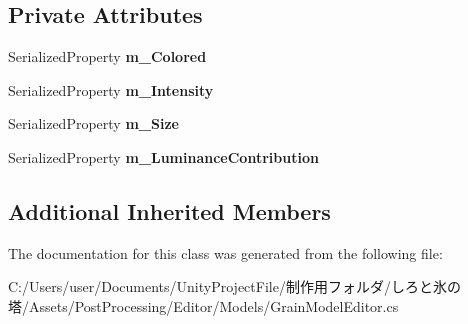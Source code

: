 \subsection*{Private Attributes}
\begin{DoxyCompactItemize}
\item 
\mbox{\label{class_unity_editor_1_1_post_processing_1_1_grain_model_editor_a91efddf056a83b2a800025a0147536bc}} 
Serialized\+Property {\bfseries m\+\_\+\+Colored}
\item 
\mbox{\label{class_unity_editor_1_1_post_processing_1_1_grain_model_editor_ae40e87abf2a62867b1901ba7138a4ea1}} 
Serialized\+Property {\bfseries m\+\_\+\+Intensity}
\item 
\mbox{\label{class_unity_editor_1_1_post_processing_1_1_grain_model_editor_a166c22de15055d16b078c568b1b62dec}} 
Serialized\+Property {\bfseries m\+\_\+\+Size}
\item 
\mbox{\label{class_unity_editor_1_1_post_processing_1_1_grain_model_editor_a95dcdfbf1ffab07467ca29fb1c383b9d}} 
Serialized\+Property {\bfseries m\+\_\+\+Luminance\+Contribution}
\end{DoxyCompactItemize}
\subsection*{Additional Inherited Members}


The documentation for this class was generated from the following file\+:\begin{DoxyCompactItemize}
\item 
C\+:/\+Users/user/\+Documents/\+Unity\+Project\+File/制作用フォルダ/しろと氷の塔/\+Assets/\+Post\+Processing/\+Editor/\+Models/Grain\+Model\+Editor.\+cs\end{DoxyCompactItemize}

